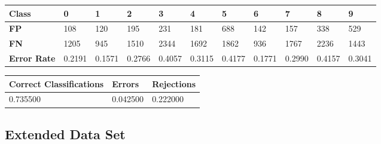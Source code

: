 \documentclass[
  a4paper,            %
  DIV=10,             %
  oneside,            %
  BCOR=5mm,           %
  parskip=half,       %
  numbers=noenddot,   %
  bibtotoc,           %
  listof=totoc,        %
  article
]{scrreprt}
\begin{document}
\begin{center}
  \begin{tabular}{|p{1cm}|p{1cm}|p{1cm}|p{1cm}|p{1cm}|p{1cm}|p{1cm}|p{1cm}|p{1cm}|p{1cm}|p{1cm}|}
    \hline
    \textbf{Class} & \textbf{0} & \textbf{1} & \textbf{2} & \textbf{3} & \textbf{4} & \textbf{5} & \textbf{6} & \textbf{7} & \textbf{8} & \textbf{9} \\
    \hline
    \textbf{FP} & 108 & 120 & 195 & 231 & 181 & 688 & 142 & 157 & 338 & 529 \\
    \hline
    \textbf{FN} & 1205 & 945 & 1510 & 2344 & 1692 & 1862 & 936 & 1767 & 2236 & 1443 \\
    \hline
    \textbf{Error Rate} & 0.2191 & 0.1571 & 0.2766 & 0.4057 & 0.3115 & 0.4177 & 0.1771 & 0.2990 & 0.4157 & 0.3041 \\
    \hline
  \end{tabular}
\end{center}

\begin{center}
  \begin{tabular}{|p{5cm}|p{3cm}|p{3cm}|}
    \hline
    \textbf{Correct Classifications} & \textbf{Errors} & \textbf{Rejections} \\
    \hline
    0.735500 & 0.042500 & 0.222000 \\
    \hline
  \end{tabular}
\end{center}
\subsection{Extended Data Set}
\end{document}
